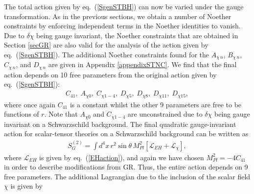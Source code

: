 \documentclass[10pt,twocolumn,preprintnumbers,amsmath,amssymb,nofootinbib
,superscriptaddress]{revtex4-1}
\begin{document}
The total action given by eq.~(\ref{SgenSTBH}) can now be varied under the gauge transformation. As in the previous sections, we obtain a number of Noether constraints by enforcing independent terms in the Noether identities to vanish. Due to $\delta\chi$ being gauge invariant, the Noether constraints that are obtained in Section \ref{secGR} are also valid for the analysis of the action given by eq.~(\ref{SgenSTBH}). The additional Noether constraints found for the $A_{\chi\,n}$, $B_{\chi\,n}$, $C_{\chi\,n}$, and $D_{\chi\,n}$ are given in Appendix \ref{appendixSTNC}. We find that the final action depends on 10 free parameters from the original action given by eq.~(\ref{SgenSTBH}):
\begin{align}
C_{41}, \; A_{\chi0}, \; C_{\chi1-4}, \; D_{\chi5}, \; D_{\chi8}, \; D_{\chi11}, \; D_{\chi15},\label{STparameters}
\end{align}
where once again $C_{41}$ is a constant whilst the other 9 parameters are free to be functions of $r$. Note that $A_{\chi0}$ and $C_{\chi1-4}$ are unconstrained due to $\delta\chi$ being gauge invariant on a Schwarzschild background. The final quadratic gauge-invariant action for scalar-tensor theories on a Schwarzschild background can be written as
\begin{align}
S^{(2)}_G=\int d^4x\,r^2\sin\theta\,M_{Pl}^2\left[\mathcal{L}_{EH}+\mathcal{L}_{\chi}\right],\label{LfinalST}
\end{align}
where $\mathcal{L}_{EH}$ is given by eq.~(\ref{EHaction}), and again we have chosen $M_{Pl}^2=-4C_{41}$ in order to describe modifications from GR. Thus, the entire action depends on 9 free parameters. The additional Lagrangian due to the inclusion of the scalar field $\chi$ is given by
\end{document}

